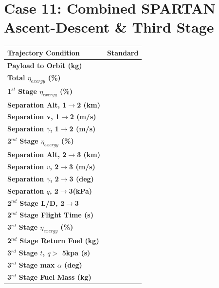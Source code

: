 \section{Case 11: Combined SPARTAN Ascent-Descent \& Third Stage}
\begin{table}[ht]
	\centering
\begin{tabular}{l c } 
	\hline \textbf{Trajectory Condition}
	&Standard

	\\
	\hline \textbf{Payload to Orbit (kg)}
	& \textbf{\PayloadToOrbitStandard}
	\\
	\textbf{Total $\eta_{exergy}$ (\%)}
	& \textbf{\totalExergyEffStandard}
	\\
	\hline 
	\textbf{1$^{st}$ Stage $\eta_{exergy}$ (\%)}
	& \textbf{\firstExergyEffStandard}
	\\
	\textbf{Separation Alt, 1$\rightarrow$2 (km)}
	& \firstsecondSeparationAltStandard
	\\
	\textbf{Separation v, 1$\rightarrow$2 (m/s)}
	& \firstsecondSeparationvStandard
	\\
	\textbf{Separation $\gamma$, 1$\rightarrow$2 (m/s)}
	& \firstsecondSeparationgammaStandard
	\\
	\hline 
	\textbf{2$^{nd}$ Stage $\eta_{exergy}$ (\%)}
	& \textbf{\secondExergyEffStandard}
	\\
	\textbf{Separation Alt, 2$\rightarrow$3 (km)}
	& \secondthirdSeparationAltStandard
	\\
	\textbf{Separation $v$, 2$\rightarrow$3 (m/s)}
	& \secondthirdSeparationvStandard
	\\
	\textbf{Separation $\gamma$, 2$\rightarrow$3 (deg)}
	& \secondthirdSeparationgammaStandard
	\\
	\textbf{Separation $q$, 2$\rightarrow$3(kPa)}
	& \secondthirdSeparationqStandard
	\\
	\textbf{2$^{nd}$ Stage L/D, 2$\rightarrow$3}
	& \secondthirdSeparationLDStandard
	\\
	\textbf{2$^{nd}$ Stage Flight Time (s)}
	& \secondFlightTimeStandard
	\\
	\hline 
	\textbf{3$^{rd}$ Stage $\eta_{exergy}$ (\%)}
	& \textbf{\thirddExergyEffStandard}
	\\
	\textbf{2$^{nd}$ Stage Return Fuel (kg)}
	& \returnFuelStandard
	\\
	\textbf{3$^{rd}$ Stage $t$, $q >$ 5kpa (s)}
	& \thirdqOverFiveStandard
	\\
	\textbf{3$^{rd}$ Stage max $\alpha$ (deg)}
	& \thirdmaxAoAStandard
	\\
	\textbf{3$^{rd}$ Stage Fuel Mass (kg)}
	& \thirdmFuelStandard
	\\
	\hline 
\end{tabular} 
\end{table}

